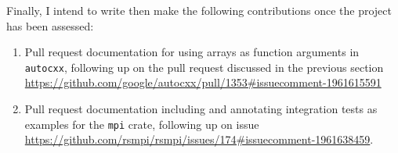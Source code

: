 Finally, I intend to write then make the following contributions once the project has been assessed:

\begin{enumerate}
    \item Pull request documentation for using arrays as function arguments in \texttt{autocxx}, following up on the pull request discussed in the previous section \url{https://github.com/google/autocxx/pull/1353#issuecomment-1961615591}
    \item Pull request documentation including and annotating integration tests as examples for the \texttt{mpi} crate, following up on issue \url{https://github.com/rsmpi/rsmpi/issues/174#issuecomment-1961638459}.
\end{enumerate}
